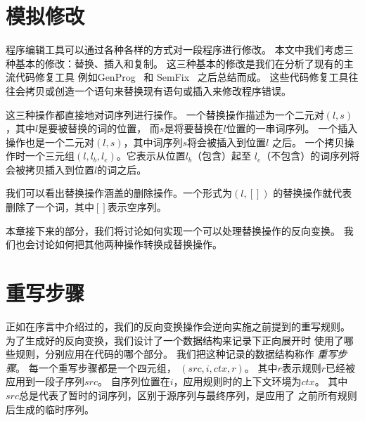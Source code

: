 
\section{模拟修改}\label{sec:changes}
程序编辑工具可以通过各种各样的方式对一段程序进行修改。
本文中我们考虑三种基本的修改：替换、插入和复制。
这三种基本的修改是我们在分析了现有的主流代码修复工具
例如GenProg~\parencite{le2012genprog} 和 SemFix~\parencite{nguyen2013semfix}
之后总结而成。
这些代码修复工具往往会拷贝或创造一个语句来替换现有语句或插入来修改程序错误。

这三种操作都直接地对词序列进行操作。
一个替换操作描述为一个二元对$(l, s)$，其中$l$是要被替换的词的位置，
而$s$是将要替换在$l$位置的一串词序列。
一个插入操作也是一个二元对$(l, s)$，其中词序列$s$将会被插入到位置$l$
之后。
一个拷贝操作时一个三元组$(l, l_b, l_e)$。它表示从位置$l_b$（包含）起至
$l_e$（不包含）的词序列将会被拷贝插入到位置$l$的词之后。

我们可以看出替换操作涵盖的删除操作。一个形式为$(l, [])$
的替换操作就代表删除了一个词，其中$[]$表示空序列。

本章接下来的部分，我们将讨论如何实现一个可以处理替换操作的反向变换。
我们也会讨论如何把其他两种操作转换成替换操作。

\section{重写步骤}\label{sec:steps}
正如在序言中介绍过的，我们的反向变换操作会逆向实施之前提到的重写规则。
为了生成好的反向变换，我们设计了一个数据结构来记录下正向展开时
使用了哪些规则，分别应用在代码的哪个部分。
我们把这种记录的数据结构称作 \emph{重写步骤}。
每一个重写步骤都是一个四元组， $(src, i, ctx, r)$。
其中$r$表示规则$r$已经被应用到一段子序列$src$。
自序列位置在$i$，应用规则时的上下文环境为$ctx$。
其中$src$总是代表了暂时的词序列，区别于源序列与最终序列，是应用了
之前所有规则后生成的临时序列。

